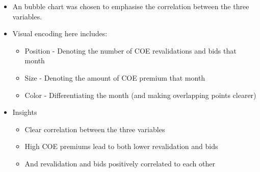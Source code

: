 \documentclass[a4paper, 11pt]{article}
\begin{document}
\begin{itemize}
\item An bubble chart was chosen to emphasise the correlation between the three variables.
\item Visual encoding here includes:
\begin{itemize}
\item Position - Denoting the number of COE revalidations and bids that month
\item Size - Denoting the amount of COE premium that month
\item Color - Differentiating the month (and making overlapping points clearer)
\end{itemize}
\item Insights
\begin{itemize}
\item Clear correlation between the three variables
\item High COE premiums lead to both lower revalidation and bids
\item And revalidation and bids positively correlated to each other
\end{itemize}
\end{itemize}
\end{document}
